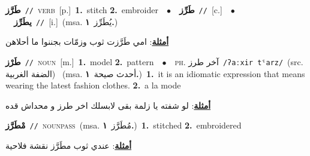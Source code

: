 \documentclass[10pt,a4paper,twoside]{article} %
\begin{document}
\begin{multicols}{2}
{\setlength\topsep{0pt}\textbf{\foreignlanguage{arabic}{طَرَّز}}\ {\color{gray}\texttt{//}\color{black}}\ \textsc{verb}\ [p.]\ \textbf{1.}~stitch  \textbf{2.}~embroider\ \ $\bullet$\ \ \setlength\topsep{0pt}\textbf{\foreignlanguage{arabic}{طَرِّز}}\ {\color{gray}\texttt{//}\color{black}}\ [c.]\ \ $\bullet$\ \ \setlength\topsep{0pt}\textbf{\foreignlanguage{arabic}{يطَرِّز}}\ {\color{gray}\texttt{//}\color{black}}\ [i.]\ \color{gray}(msa. \foreignlanguage{arabic}{يُطَرِّز}~\foreignlanguage{arabic}{\textbf{١.}})\color{black}\  \begin{flushright}\color{gray}\foreignlanguage{arabic}{\textbf{\underline{\foreignlanguage{arabic}{أمثلة}}}: امي طَرَّزت ثوب وزمّات بجننوا ما أحلاهن}\end{flushright}\color{black}} \vspace{2mm}

{\setlength\topsep{0pt}\textbf{\foreignlanguage{arabic}{طَرْز}}\ {\color{gray}\texttt{//}\color{black}}\ \textsc{noun}\ [m.]\ \textbf{1.}~model  \textbf{2.}~pattern\ \ $\bullet$\ \ \textsc{ph.} \color{gray} \foreignlanguage{arabic}{آخر طرز}\color{black}\ {\color{gray}\texttt{/{\sffamily ʔaːxir tˤarz}/}\color{black}}\ \color{gray}(src. \foreignlanguage{arabic}{الضفة الغربية})\color{black}\ \color{gray} (msa. \foreignlanguage{arabic}{أحدث صيحة}~\foreignlanguage{arabic}{\textbf{١.}})\color{black}\ \textbf{1.}~it is an idiomatic expression that means wearing the latest fashion clothes.  \textbf{2.}~a la mode\  \begin{flushright}\color{gray}\foreignlanguage{arabic}{\textbf{\underline{\foreignlanguage{arabic}{أمثلة}}}: لو شفته يا زلمة بقى لابسلك اخر طرز و محداش قده}\end{flushright}\color{black}} \vspace{2mm}

{\setlength\topsep{0pt}\textbf{\foreignlanguage{arabic}{مْطَرَّز}}\ {\color{gray}\texttt{//}\color{black}}\ \textsc{noun\textunderscore pass}\ \color{gray}(msa. \foreignlanguage{arabic}{مُطَرَّز}~\foreignlanguage{arabic}{\textbf{١.}})\color{black}\ \textbf{1.}~stitched  \textbf{2.}~embroidered\  \begin{flushright}\color{gray}\foreignlanguage{arabic}{\textbf{\underline{\foreignlanguage{arabic}{أمثلة}}}: عندي ثوب مطَرَّز نقشة فلاحية}\end{flushright}\color{black}} \vspace{2mm}


\end{multicols}
\end{document}
